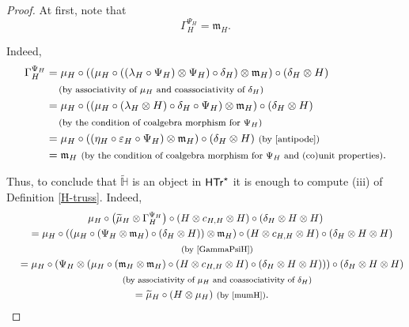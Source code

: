 \documentclass[10pt,a4paper]{amsart}
\numberwithin{equation}{section}
\begin{document}
\begin{proof}
At first, note that
\begin{equation}\label{GammaPsiH}
\Gamma_{H}^{\Psi_{H}}=\mathfrak{m}_{H}.
\end{equation}

Indeed,
\begin{align*}
\Gamma_{H}^{\Psi_{H}}
&{}=\mu_{H}\circ((\mu_{H}\circ((\lambda_{H}\circ\Psi_{H})\otimes\Psi_{H})\circ\delta_{H})\otimes\mathfrak{m}_{H})\circ(\delta_{H}\otimes H)\\
&\quad{}\, \text{\footnotesize\textnormal{(by associativity of $\mu_{H}$ and coassociativity of $\delta_{H}$)}}\\
&{}=\mu_{H}\circ((\mu_{H}\circ(\lambda_{H}\otimes H)\circ\delta_{H}\circ\Psi_{H})\otimes\mathfrak{m}_{H})\circ(\delta_{H}\otimes H)\\
&\quad{}\, \text{\footnotesize\textnormal{(by the condition of coalgebra morphism for $\Psi_{H}$)}}\\
&{}=\mu_{H}\circ((\eta_{H}\circ\varepsilon_{H}\circ\Psi_{H})\otimes\mathfrak{m}_{H})\circ(\delta_{H}\otimes H)\ \text{\footnotesize\textnormal{(by \eqref{antipode})}}\\
&{}=\mathfrak{m}_{H}\ \text{\footnotesize\textnormal{(by the condition of coalgebra morphism for $\Psi_{H}$ and (co)unit properties)}}.
\end{align*}

Thus, to conclude that $\widetilde{\mathbb{H}}$ is an object in $\sf{HTr}^{\star}$ it is enough to compute (iii) of Definition \ref{H-truss}. Indeed,
\begin{gather*}
\mu_{H}\circ\bigl(\widetilde{\mu}_{H}\otimes\Gamma_{H}^{\Psi_{H}}\bigr)\circ(H\otimes c_{H,H}\otimes H)\circ(\delta_{H}\otimes H\otimes H)\\
\quad{}=\mu_{H}\circ((\mu_{H}\circ(\Psi_{H}\otimes\mathfrak{m}_{H})\circ(\delta_{H}\otimes H))\otimes \mathfrak{m}_{H})\circ(H\otimes c_{H,H}\otimes H)\circ(\delta_{H}\otimes H\otimes H)\\
\qquad{}\;\text{\footnotesize\textnormal{(by \eqref{GammaPsiH})}}\\
\quad{}=\mu_{H}\circ(\Psi_{H}\otimes(\mu_{H}\circ(\mathfrak{m}_{H}\otimes\mathfrak{m}_{H})\circ(H\otimes c_{H,H}\otimes H)\circ(\delta_{H}\otimes H\otimes H)))\circ(\delta_{H}\otimes H\otimes H)\\
\qquad{}\; \text{\footnotesize\textnormal{(by associativity of $\mu_{H}$ and coassociativity of $\delta_{H}$)}}\\
\quad{}=\widetilde{\mu}_{H}\circ(H\otimes\mu_{H})\ \text{\footnotesize\textnormal{(by \eqref{mumH})}}.\tag*{\qed}
\end{gather*}
\renewcommand{\qed}{}
\end{proof}
\end{document}
